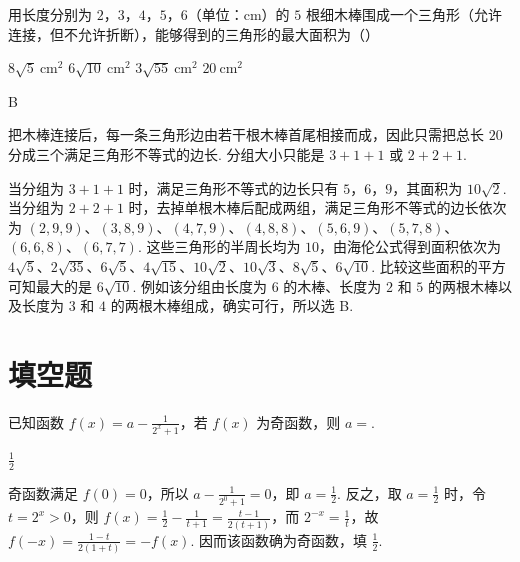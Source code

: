 \begin{problem}
用长度分别为 \(2\)，\(3\)，\(4\)，\(5\)，\(6\)（单位：\(\mathrm{cm}\)）的 \(5\) 根细木棒围成一个三角形（允许连接，但不允许折断），能够得到的三角形的最大面积为（\quad）

\choices
    {\(8\sqrt{5}\mathrm{~cm}^{2}\)}
    {\(6\sqrt{10}\mathrm{~cm}^{2}\)}
    {\(3\sqrt{55}\mathrm{~cm}^{2}\)}
    {\(20\mathrm{~cm}^{2}\)}
\end{problem}

\begin{answer}
B
\end{answer}

\begin{solution}
把木棒连接后，每一条三角形边由若干根木棒首尾相接而成，因此只需把总长 \(20\) 分成三个满足三角形不等式的边长. 分组大小只能是 \(3+1+1\) 或 \(2+2+1\).

当分组为 \(3+1+1\) 时，满足三角形不等式的边长只有 \(5\)，\(6\)，\(9\)，其面积为 \(10\sqrt{2}\). 当分组为 \(2+2+1\) 时，去掉单根木棒后配成两组，满足三角形不等式的边长依次为 \((2,9,9)\)、\((3,8,9)\)、\((4,7,9)\)、\((4,8,8)\)、\((5,6,9)\)、\((5,7,8)\)、\((6,6,8)\)、\((6,7,7)\). 这些三角形的半周长均为 \(10\)，由海伦公式得到面积依次为 \(4\sqrt{5}\)、\(2\sqrt{35}\)、\(6\sqrt{5}\)、\(4\sqrt{15}\)、\(10\sqrt{2}\)、\(10\sqrt{3}\)、\(8\sqrt{5}\)、\(6\sqrt{10}\). 比较这些面积的平方可知最大的是 \(6\sqrt{10}\). 例如该分组由长度为 \(6\) 的木棒、长度为 \(2\) 和 \(5\) 的两根木棒以及长度为 \(3\) 和 \(4\) 的两根木棒组成，确实可行，所以选 B.
\end{solution}

\section{填空题}
\begin{problem}
已知函数 \( f(x) = a - \frac{1}{2^x + 1} \)，若 \( f(x) \) 为奇函数，则 \( a = \)\fillinblank{}.
\end{problem}

\begin{answer}
\(\frac{1}{2}\)
\end{answer}

\begin{solution}
奇函数满足 \(f(0)=0\)，所以 \(a-\frac{1}{2^{0}+1}=0\)，即 \(a=\frac{1}{2}\). 反之，取 \(a=\frac{1}{2}\) 时，令 \(t=2^{x}>0\)，则
\(f(x)=\frac{1}{2}-\frac{1}{t+1}=\frac{t-1}{2(t+1)}\)，而 \(2^{-x}=\frac{1}{t}\)，故 \(f(-x)=\frac{1-t}{2(1+t)}=-f(x)\). 因而该函数确为奇函数，填 \(\frac{1}{2}\).
\end{solution}

